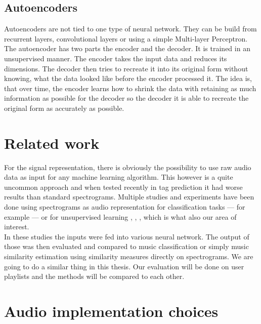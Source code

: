 \subsection{Autoencoders}
Autoencoders are not tied to one type of neural network. They can be build from recurrent layers, convolutional layers or using a simple Multi-layer Perceptron.\\
The autoencoder has two parts the encoder and the decoder. It is trained in an unsupervised manner. The encoder takes the input data and reduces its dimensions. The decoder then tries to recreate it into its original form without knowing, what the data looked like before the encoder processed it. The idea is, that over time, the encoder learns how to shrink the data with retaining as much information as possible for the decoder so the decoder it is able to recreate the original form as accurately as possible. 

\section{Related work}\label{sec:audio_related_work}
For the signal representation, there is obviously the possibility to use raw audio data as input for any machine learning algorithm. This however is a quite uncommon approach and when tested recently in tag prediction \cite{6854950} it had worse results than standard spectrograms. Multiple studies and experiments have been done using spectrograms as audio representation for classification tasks --- for example \cite{wang2014improving} --- or for unsupervised learning \cite{van2013deep}, \cite{Ramakrishnan2017song2V}, \cite{NIPS2009_3674}, which is what also our area of interest. \\
In these studies the inputs were fed into various neural network. The output of those was then evaluated and compared to music classification or simply music similarity estimation using similarity measures directly on spectrograms. We are going to do a similar thing in this thesis. Our evaluation will be done on user playlists and the methods will be compared to each other.

\section{Audio implementation choices}

